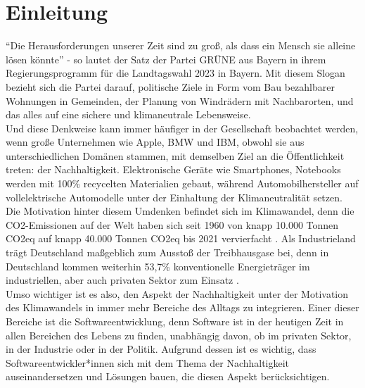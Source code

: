 \chapter{Einleitung} %
\enquote{Die Herausforderungen unserer Zeit sind zu groß, als dass ein Mensch sie alleine lösen könnte} - so lautet der Satz der Partei GRÜNE aus Bayern in ihrem Regierungsprogramm für die Landtagswahl 2023 in Bayern. Mit diesem Slogan bezieht sich die Partei darauf, politische Ziele in Form vom Bau bezahlbarer Wohnungen in Gemeinden, der Planung von Windrädern mit Nachbarorten, und das alles auf eine sichere und klimaneutrale Lebensweise. \\ Und diese Denkweise kann immer häufiger in der Gesellschaft beobachtet werden, wenn große Unternehmen wie Apple, BMW und IBM, obwohl sie aus unterschiedlichen Domänen stammen, mit demselben Ziel an die Öffentlichkeit treten: der Nachhaltigkeit. Elektronische Geräte wie Smartphones, Notebooks werden mit 100\% recycelten Materialien gebaut, während Automobilhersteller auf vollelektrische Automodelle unter der Einhaltung der Klimaneutralität setzen. Die Motivation hinter diesem Umdenken befindet sich im Klimawandel, denn die CO2-Emissionen auf der Welt haben sich seit 1960 von knapp 10.000 Tonnen CO2eq auf knapp 40.000 Tonnen CO2eq bis 2021 vervierfacht \cite{GlobalCarbonAtlas2023}. Als Industrieland trägt Deutschland maßgeblich zum Ausstoß der Treibhausgase bei, denn in Deutschland kommen weiterhin 53,7\% konventionelle Energieträger im industriellen, aber auch privaten Sektor zum Einsatz \cite{StatistischesBundesamt2023}. \\
Umso wichtiger ist es also, den Aspekt der Nachhaltigkeit unter der Motivation des Klimawandels in immer mehr Bereiche des Alltags zu integrieren. Einer dieser Bereiche ist die Softwareentwicklung, denn Software ist in der heutigen Zeit in allen Bereichen des Lebens zu finden, unabhängig davon, ob im privaten Sektor, in der Industrie oder in der Politik. Aufgrund dessen ist es wichtig, dass Softwareentwickler*innen sich mit dem Thema der Nachhaltigkeit auseinandersetzen und Lösungen bauen, die diesen Aspekt berücksichtigen.

